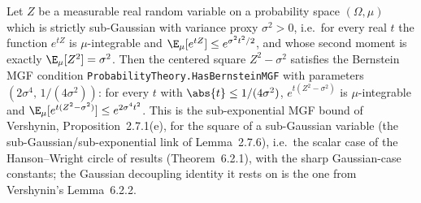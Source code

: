 \begin{theorem}
\label{subgaussian_centered_sq_bernstein}
\leanok
{}
Let $Z$ be a measurable real random variable on a probability space $(\Omega, \mu)$
which is strictly sub-Gaussian with variance proxy $\sigma^2 > 0$, i.e.\ for every real
$t$ the function $e^{tZ}$ is $\mu$-integrable and $\E_\mu[e^{tZ}] \le e^{\sigma^2 t^2/2}$,
and whose second moment is exactly $\E_\mu[Z^2] = \sigma^2$.  Then the centered square
$Z^2 - \sigma^2$ satisfies the Bernstein MGF condition
\texttt{ProbabilityTheory.HasBernsteinMGF} with parameters $(2\sigma^4,\, 1/(4\sigma^2))$:
for every $t$ with $\abs{t} \le 1/(4\sigma^2)$, $e^{t(Z^2 - \sigma^2)}$ is
$\mu$-integrable and $\E_\mu[e^{t(Z^2 - \sigma^2)}] \le e^{2\sigma^4 t^2}$.  This is the
sub-exponential MGF bound of Vershynin, Proposition~2.7.1(e), for the square of a
sub-Gaussian variable (the sub-Gaussian/sub-exponential link of Lemma~2.7.6), i.e.\ the
scalar case of the Hanson--Wright circle of results (Theorem~6.2.1), with the sharp
Gaussian-case constants; the Gaussian decoupling identity it rests on is the one from
Vershynin's Lemma~6.2.2.
\end{theorem}
